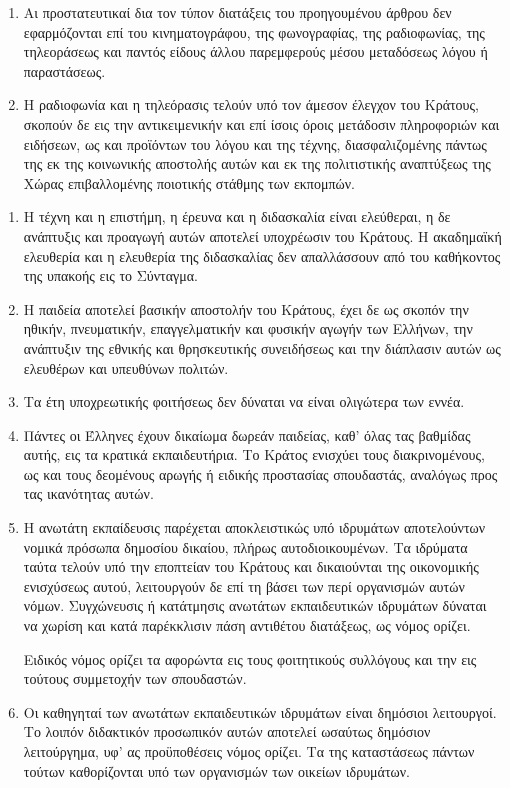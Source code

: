 \documentclass[twoside, a4paper, 10pt]{article}
\begin{document}
\begin{multicols}{2}
\begin{enumerate}
\begin{BigQuote}
\begin{enumerate}
  \item[1.] Αι προστατευτικαί δια τον τύπον διατάξεις του προηγουμένου άρθρου δεν εφαρμόζονται επί του κινηματογράφου, της φωνογραφίας, της ραδιοφωνίας, της τηλεοράσεως και παντός είδους άλλου παρεμφερούς μέσου μεταδόσεως λόγου ή παραστάσεως.
  \item[2.] Η ραδιοφωνία και η τηλεόρασις τελούν υπό τον άμεσον έλεγχον του Κράτους, σκοπούν δε εις την αντικειμενικήν και επί ίσοις όροις μετάδοσιν πληροφοριών και ειδήσεων, ως και προϊόντων του λόγου και της τέχνης, διασφαλιζομένης πάντως της εκ της κοινωνικής αποστολής αυτών και εκ της πολιτιστικής αναπτύξεως της Χώρας επιβαλλομένης ποιοτικής στάθμης των εκπομπών.
\end{enumerate}

\begin{enumerate}
  \item[1.] Η τέχνη και η επιστήμη, η έρευνα και η διδασκαλία είναι ελεύθεραι, η δε ανάπτυξις και προαγωγή αυτών αποτελεί υποχρέωσιν του Κράτους. Η ακαδημαϊκή ελευθερία και η ελευθερία της διδασκαλίας δεν απαλλάσσουν από του καθήκοντος της υπακοής εις το Σύνταγμα.
  \item[2.] Η παιδεία αποτελεί βασικήν αποστολήν του Κράτους, έχει δε ως σκοπόν την ηθικήν, πνευματικήν, επαγγελματικήν και φυσικήν αγωγήν των Ελλήνων, την ανάπτυξιν της εθνικής και θρησκευτικής συνειδήσεως και την διάπλασιν αυτών ως ελευθέρων και υπευθύνων πολιτών.
  \item[3.] Τα έτη υποχρεωτικής φοιτήσεως δεν δύναται να είναι ολιγώτερα των εννέα.
  \item[4.] Πάντες οι Έλληνες έχουν δικαίωμα δωρεάν παιδείας, καθ' όλας τας βαθμίδας αυτής, εις τα κρατικά εκπαιδευτήρια. Το Κράτος ενισχύει τους  διακρινομένους, ως και τους δεομένους αρωγής ή ειδικής προστασίας σπουδαστάς, αναλόγως προς τας ικανότητας αυτών.
  \item[5.] Η ανωτάτη εκπαίδευσις παρέχεται αποκλειστικώς υπό ιδρυμάτων αποτελούντων νομικά πρόσωπα δημοσίου δικαίου, πλήρως αυτοδιοικουμένων. Τα ιδρύματα ταύτα τελούν υπό την εποπτείαν του Κράτους και δικαιούνται της οικονομικής ενισχύσεως αυτού, λειτουργούν δε επί τη βάσει των περί οργανισμών αυτών νόμων. Συγχώνευσις ή κατάτμησις ανωτάτων εκπαιδευτικών ιδρυμάτων δύναται να χωρίση και κατά παρέκκλισιν πάση αντιθέτου διατάξεως, ως νόμος ορίζει.

Ειδικός νόμος ορίζει τα αφορώντα εις τους φοιτητικούς συλλόγους και την εις τούτους συμμετοχήν των σπουδαστών.
  \item[6.] Οι καθηγηταί των ανωτάτων εκπαιδευτικών ιδρυμάτων είναι δημόσιοι λειτουργοί. Το λοιπόν διδακτικόν προσωπικόν αυτών αποτελεί ωσαύτως δημόσιον λειτούργημα, υφ' ας προϋποθέσεις νόμος ορίζει. Τα της καταστάσεως πάντων τούτων καθορίζονται υπό των οργανισμών των οικείων ιδρυμάτων.
  

\end{enumerate}
\end{BigQuote}
\end{enumerate}
\end{multicols}
\end{document}
